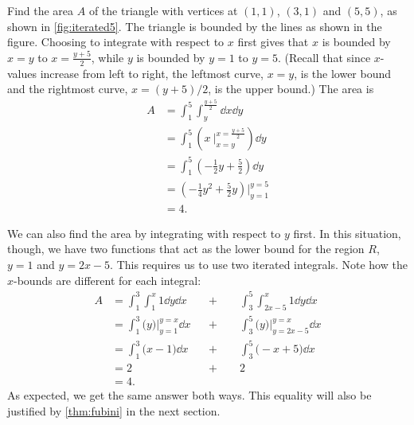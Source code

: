 \begin{example}\label{ex_iterated5}%
Find the area $A$ of the triangle with vertices at $(1,1)$, $(3,1)$ and $(5,5)$, as shown in \autoref{fig:iterated5}.
%
\solution
The triangle is bounded by the lines as shown in the figure. Choosing to integrate with respect to $x$ first gives that $x$ is bounded by $x=y$ to $x = \frac{y+5}2$, while $y$ is bounded by $y=1$ to $y=5$. (Recall that since $x$-values increase from left to right, the leftmost curve, $x=y$, is the lower bound and the rightmost curve, $x=(y+5)/2$, is the upper bound.) The area is
\begin{align*}
A &= \int_1^5\int_{y}^{\frac{y+5}2}\dd x\dd y \\
 &= \int_1^5\left(x\ \Big|_{x=y}^{x=\frac{y+5}2}\right)\dd y \\
&= \int_1^5 \left(-\frac12y+\frac52\right)\dd y \\
&= \left(-\frac14y^2+\frac52y\right)\Big|_{y=1}^{y=5}\\
&=4.
\end{align*}

We can also find the area by integrating with respect to $y$ first. In this situation, though, we have two functions that act as the lower bound for the region $R$, $y=1$ and $y=2x-5$. This requires us to use two iterated integrals. Note how the $x$-bounds are different for each integral:
\begin{align*}
 A
 &= \int_1^3\int_1^x 1\dd y \dd x &&+\qquad\int_3^5\int_{2x-5}^x1\dd y\dd x\\
 &= \int_1^3\bigl(y\bigr)\Big|_{y=1}^{y=x}\dd x &&+\qquad\int_3^5\bigl(y\bigr)\Big|_{y=2x-5}^{y=x}\dd x\\
 &= \int_1^3\bigl(x-1\bigr)\dd x &&+\qquad\int_3^5\bigl(-x+5\bigr)\dd x \\
 &= 2 &&+\qquad2 \\
 &=4.
\end{align*}
As expected, we get the same answer both ways.  This equality will also be justified by \autoref{thm:fubini} in the next section.
\end{example}


